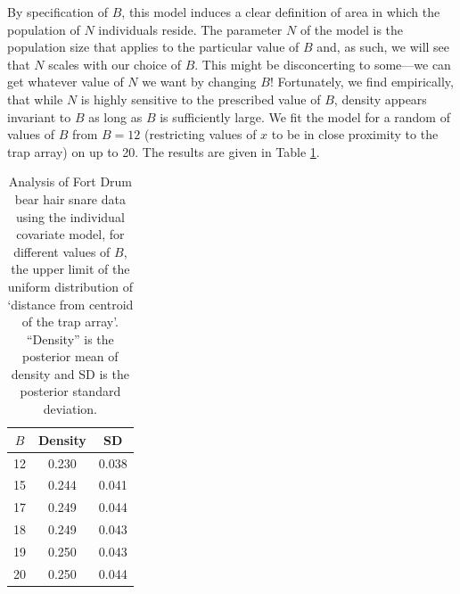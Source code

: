 By specification of $B$,
this model
induces a clear definition of area
in which the population of $N$ individuals reside.
The parameter $N$ of the model is the
population size that applies to the particular value of $B$ and,
as such, we will see that $N$ scales with our choice of $B$.
This might be disconcerting to some---we can get whatever value of
$N$ we want by changing $B$!
Fortunately, we find empirically, that while $N$ is
highly sensitive to the prescribed value of $B$, density appears 
invariant to $B$ as long as $B$ is sufficiently
large. We fit the model for a random of values of $B$ from $B=12$ (restricting
values of $x$ to be in close proximity to
the trap array) on up to 20. The results are given in Table
\ref{closed.tab.Dmax}.

\begin{table}[ht]
\centering
\caption{Analysis of Fort Drum bear hair snare data using the
  individual covariate model, for different values of $B$, the upper
  limit of the uniform distribution of `distance from centroid of the
  trap array'. ``Density'' is the posterior mean of density and SD is
  the posterior standard deviation.}
\begin{tabular}{ccc}
\hline %
 $B$ & Density & SD \\ \hline
  12& 0.230 & 0.038 \\
  15& 0.244 &0.041 \\
  17& 0.249 &0.044 \\
  18& 0.249 &0.043\\
  19& 0.250 &0.043\\
  20& 0.250 &0.044 \\
\hline
\end{tabular}
\label{closed.tab.Dmax}
\end{table}



